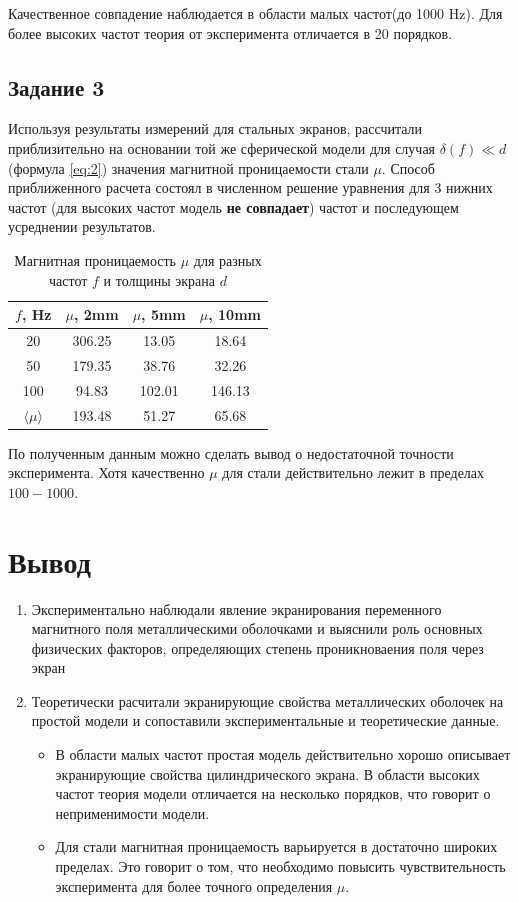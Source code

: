Качественное совпадение наблюдается в области малых частот(до 1000 Hz). Для более высоких частот теория от эксперимента отличается в 20 порядков.
\subsection{Задание 3}
Используя результаты измерений для стальных экранов, рассчитали приблизительно на основании той же сферической модели для случая $\delta (f) \ll d$ (формула \eqref{eq:2}) значения магнитной проницаемости стали $\mu$. Способ приближенного расчета состоял в численном решение уравнения для 3 нижних частот (для высоких частот модель \textbf{не совпадает}) частот и последующем усреднении результатов.
\begin{table}[htbp]
  \centering
  \caption{Магнитная проницаемость $\mu$ для разных частот $f$ и толщины экрана $d$}
    \begin{tabular}{|c|c|c|c|}
    \toprule
    $f$, Hz & $\mu$, 2mm & $\mu$, 5mm & $\mu$, 10mm \\
    \midrule
    20 & 306.25 & 13.05 & 18.64 \\
    \midrule
    50 & 179.35 & 38.76 & 32.26 \\
    \midrule
    100 & 94.83 & 102.01 & 146.13 \\
    \midrule
    $\langle \mu \rangle$ & 193.48 & 51.27 & 65.68 \\
    \bottomrule
    \end{tabular}%
\end{table}%
По полученным данным можно сделать вывод о недостаточной точности эксперимента. Хотя качественно $\mu$ для стали действительно лежит в пределах $100-1000$.
\section{Вывод}
\begin{enumerate}
	\item Экспериментально наблюдали явление экранирования переменного магнитного поля металлическими оболочками и выяснили роль основных физических факторов, определяющих степень проникноваения поля через экран
	\item Теоретически расчитали экранирующие свойства металлических оболочек на простой модели и сопоставили экспериментальные и теоретические данные.
	\begin{itemize}
		\item В области малых частот простая модель действительно хорошо описывает экранирующие свойства цилиндрического экрана. В области высоких частот теория модели отличается на несколько порядков, что говорит о неприменимости модели.
		\item Для стали магнитная проницаемость варьируется в достаточно широких пределах. Это говорит о том, что необходимо повысить чувствительность эксперимента для более точного определения $\mu$.
	\end{itemize}
\end{enumerate}
